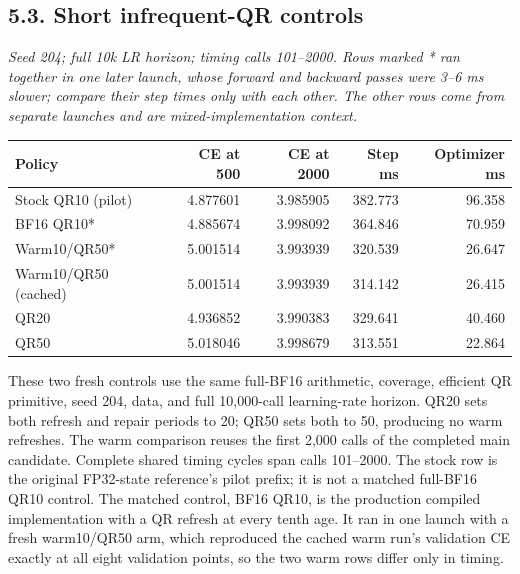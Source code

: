 \hypertarget{short-infrequent-qr-controls}{%
\subsection{5.3. Short infrequent-QR
controls}\label{short-infrequent-qr-controls}}

\begin{minipage}{\linewidth}

\emph{Seed 204; full 10k LR horizon; timing calls 101--2000. Rows
marked * ran together in one later launch, whose forward and backward
passes were 3--6 ms slower; compare their step times only with each
other. The other rows come from separate launches and are
mixed-implementation context.}

\begin{center}
\begin{tabular}{@{}lrrrr@{}}
\toprule\noalign{}
Policy & CE at 500 & CE at 2000 & Step ms & Optimizer ms \\
\midrule\noalign{}
Stock QR10 (pilot) & 4.877601 & 3.985905 & 382.773 & 96.358 \\
BF16 QR10* & 4.885674 & 3.998092 & 364.846 & 70.959 \\
Warm10/QR50* & 5.001514 & 3.993939 & 320.539 & 26.647 \\
Warm10/QR50 (cached) & 5.001514 & 3.993939 & 314.142 & 26.415 \\
QR20 & 4.936852 & 3.990383 & 329.641 & 40.460 \\
QR50 & 5.018046 & 3.998679 & 313.551 & 22.864 \\
\bottomrule
\end{tabular}
\end{center}

\end{minipage}

These two fresh controls use the same full-BF16 arithmetic, coverage,
efficient QR primitive, seed 204, data, and full 10,000-call
learning-rate horizon. QR20 sets both refresh and repair periods to 20;
QR50 sets both to 50, producing no warm refreshes. The warm comparison
reuses the first 2,000 calls of the completed main candidate. Complete
shared timing cycles span calls 101--2000. The stock row is the original
FP32-state reference's pilot prefix; it is not a matched full-BF16 QR10
control. The matched control, BF16 QR10, is the production compiled
implementation with a QR refresh at every tenth age. It ran in one
launch with a fresh warm10/QR50 arm, which reproduced the cached warm
run's validation CE exactly at all eight validation points, so the two
warm rows differ only in timing.

